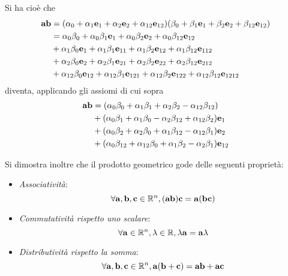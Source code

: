 \begin{frame}
    Si ha cioè che 
    \[\begin{aligned}
        \mathbf{ab} &= 
            (\alpha_{0} + \alpha_{1}\mathbf{e}_{1} + \alpha_{2}\mathbf{e}_{2} 
                + \alpha_{12}\mathbf{e}_{12})
            (\beta_{0} + \beta_{1}\mathbf{e}_{1} + \beta_{2}\mathbf{e}_{2}
                + \beta_{12}\mathbf{e}_{12}) \\
            & = \alpha_{0}\beta_{0} + \alpha_{0}\beta_{1}\mathbf{e}_{1}
            + \alpha_{0}\beta_{2}\mathbf{e}_{2} 
            + \alpha_{0}\beta_{12}\mathbf{e}_{12} \\
            & + \alpha_{1}\beta_{0}\mathbf{e}_{1} + \alpha_{1}\beta_{1}\mathbf{e}_{11}
              + \alpha_{1}\beta_{2}\mathbf{e}_{12} 
              + \alpha_{1}\beta_{12}\mathbf{e}_{112} \\
            & + \alpha_{2}\beta_{0}\mathbf{e}_{2} + \alpha_{2}\beta_{1}\mathbf{e}_{21}
              + \alpha_{2}\beta_{2}\mathbf{e}_{22} 
              + \alpha_{2}\beta_{12}\mathbf{e}_{212} \\ 
            & + \alpha_{12}\beta_{0}\mathbf{e}_{12} 
              + \alpha_{12}\beta_{1}\mathbf{e}_{121}
              + \alpha_{12}\beta_{2}\mathbf{e}_{122} 
              + \alpha_{12}\beta_{12}\mathbf{e}_{1212}  
    \end{aligned}\]
    diventa, applicando gli assiomi di cui sopra
    \[\begin{aligned}
        \mathbf{ab} & = 
            (\alpha_{0}\beta_{0} + \alpha_{1}\beta_{1} 
                + \alpha_{2}\beta_{2} - \alpha_{12}\beta_{12}) \\ 
            & + (\alpha_{0}\beta_{1} + \alpha_{1}\beta_{0} 
                - \alpha_{2}\beta_{12} + \alpha_{12}\beta_{2})\mathbf{e}_{1} \\
            & + (\alpha_{0}\beta_{2} + \alpha_{2}\beta_{0} 
                + \alpha_{1}\beta_{12} - \alpha_{12}\beta_{1})\mathbf{e}_{2} \\
            & + (\alpha_{0}\beta_{12} + \alpha_{12}\beta_{0} 
                + \alpha_{1}\beta_{2} - \alpha_{2}\beta_{1})\mathbf{e}_{12}
    \end{aligned}\]
\end{frame}
\begin{frame}
    Si dimostra inoltre che il prodotto geometrico gode delle seguenti proprietà:
    \begin{itemize}
        \item [ ] \emph{Associatività}: 
            \[
                \forall \mathbf{a}, \mathbf{b}, \mathbf{c} \in \mathbb{R}^{n},
                (\mathbf{ab})\mathbf{c} = \mathbf{a}(\mathbf{bc})
            \]
        \item [ ] \emph{Commutatività rispetto uno scalare}: 
            \[
                \forall \mathbf{a} \in \mathbb{R}^{n}, \lambda \in \mathbb{R}, 
                \lambda\mathbf{a} = \mathbf{a}\lambda
            \]
        \item [ ] \emph{Distributività rispetto la somma}:
            \[
                \forall \mathbf{a}, \mathbf{b}, \mathbf{c} \in \mathbb{R}^{n},
                \mathbf{a}(\mathbf{b} + \mathbf{c}) = \mathbf{ab} + \mathbf{ac}
            \]
    \end{itemize}
\end{frame}
